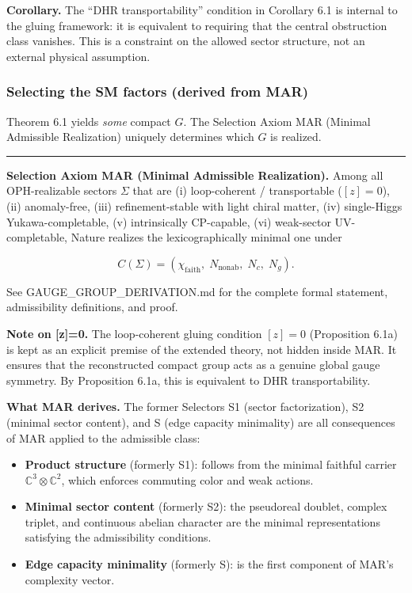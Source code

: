 \documentclass[11pt,a4paper]{article}
\theoremstyle{remark}
\providecommand{\tightlist}{%
  \setlength{\itemsep}{0pt}\setlength{\parskip}{0pt}}
\begin{document}
\textbf{Corollary.} The ``DHR transportability'' condition in Corollary 6.1 is
internal to the gluing framework: it is equivalent to requiring that the
central obstruction class vanishes. This is a constraint on the allowed
sector structure, not an external physical assumption.

\subsubsection{Selecting the SM factors (derived from MAR)}\label{selecting-the-sm-factors-derived-from-mar}

Theorem 6.1 yields \emph{some} compact \(G\). The Selection Axiom MAR (Minimal
Admissible Realization) uniquely determines which \(G\) is realized.

\begin{center}\rule{0.5\linewidth}{0.5pt}\end{center}

\textbf{Selection Axiom MAR (Minimal Admissible Realization).} Among all
OPH-realizable sectors \(\Sigma\) that are (i) loop-coherent / transportable
(\([z]=0\)), (ii) anomaly-free, (iii) refinement-stable with light chiral
matter, (iv) single-Higgs Yukawa-completable, (v) intrinsically CP-capable,
(vi) weak-sector UV-completable, Nature realizes the lexicographically
minimal one under

\[C(\Sigma) = (\chi_{\mathrm{faith}},\; N_{\mathrm{nonab}},\; N_c,\; N_g).\]

See GAUGE\_GROUP\_DERIVATION.md for the complete formal statement, admissibility
definitions, and proof.

\textbf{Note on {[}z{]}=0.} The loop-coherent gluing condition \([z]=0\) (Proposition
6.1a) is kept as an explicit premise of the extended theory, not hidden inside
MAR. It ensures that the reconstructed compact group acts as a genuine global
gauge symmetry. By Proposition 6.1a, this is equivalent to DHR
transportability.

\textbf{What MAR derives.} The former Selectors S1 (sector factorization), S2
(minimal sector content), and S (edge capacity minimality) are all consequences
of MAR applied to the admissible class:

\begin{itemize}
\tightlist
\item
  \textbf{Product structure} (formerly S1): follows from the minimal faithful carrier
  \(\mathbb{C}^3 \otimes \mathbb{C}^2\), which enforces commuting color and weak
  actions.
\item
  \textbf{Minimal sector content} (formerly S2): the pseudoreal doublet, complex
  triplet, and continuous abelian character are the minimal representations
  satisfying the admissibility conditions.
\item
  \textbf{Edge capacity minimality} (formerly S): is the first component of MAR's
  complexity vector.
\end{itemize}
\end{document}
